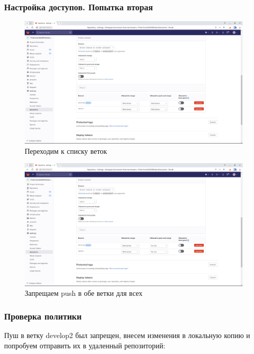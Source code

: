 \documentclass[a4paper]{article}
\begin{document}
  \subsubsection{Настройка доступов. Попытка вторая}

  \begin{figure}[H]
    \centering
    \includegraphics[width=\textwidth]{1_ (31)}
    \caption{Переходим к списку веток}
  \end{figure}

  \begin{figure}[H]
    \centering
    \includegraphics[width=\textwidth]{1_ (30)}
    \caption{Запрещаем push в обе ветки для всех}
  \end{figure}

  \subsubsection{Проверка политики}

  Пуш в ветку develop2 был запрещен, внесем изменения в локальную копию и попробуем
  отправить их в удаленный репозиторий:
\end{document}
